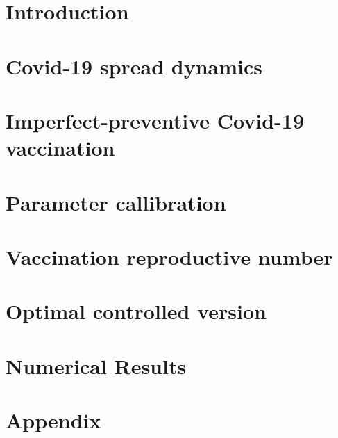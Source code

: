 \documentclass[sort&compress]{elsarticle}
\begin{document}
    
    \section{Introduction}
        
    \section{Covid-19 spread dynamics}
        
    \section{Imperfect-preventive Covid-19 vaccination}
        
    \section{Parameter callibration}
        
    \section{Vaccination reproductive number}
        
    \section{Optimal controlled version}
        
    \section{Numerical Results}
    \listofchanges[style=compactsummary]
    \appendix
  \section{Appendix}
    
  
  
\end{document}
